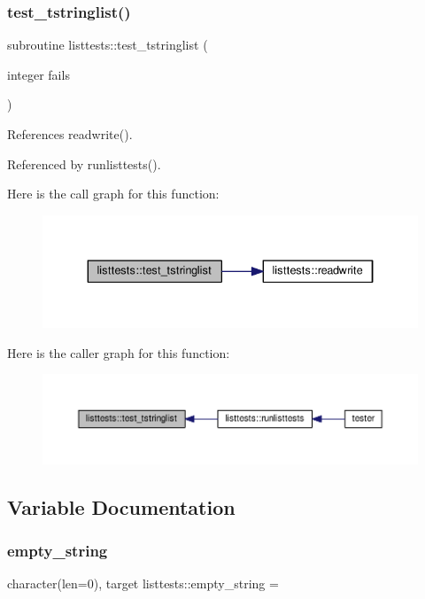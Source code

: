 \subsubsection{\texorpdfstring{test\+\_\+tstringlist()}{test\_tstringlist()}}
{\footnotesize\ttfamily subroutine listtests\+::test\+\_\+tstringlist (\begin{DoxyParamCaption}\item[{integer}]{fails }\end{DoxyParamCaption})}



References readwrite().



Referenced by runlisttests().

Here is the call graph for this function\+:
\nopagebreak
\begin{figure}[H]
\begin{center}
\leavevmode
\includegraphics[width=334pt]{namespacelisttests_ac1845c4c485f6e393be29fa693c91a1a_cgraph}
\end{center}
\end{figure}
Here is the caller graph for this function\+:
\nopagebreak
\begin{figure}[H]
\begin{center}
\leavevmode
\includegraphics[width=350pt]{namespacelisttests_ac1845c4c485f6e393be29fa693c91a1a_icgraph}
\end{center}
\end{figure}


\subsection{Variable Documentation}
\mbox{\label{namespacelisttests_a6535e1adc91fb7d5f300c697b8bc72dc}} 
\subsubsection{\texorpdfstring{empty\+\_\+string}{empty\_string}}
{\footnotesize\ttfamily character(len=0), target listtests\+::empty\+\_\+string = \textquotesingle{}\textquotesingle{}}

